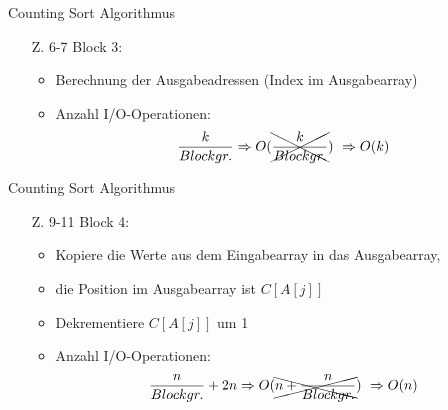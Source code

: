 \documentclass{beamer}
\begin{document}
\begin{frame}{Counting Sort Algorithmus}
  \begin{itemize}
    \item[Z. 6-7] Block 3:
    \begin{itemize}
      \item Berechnung der Ausgabeadressen (Index im Ausgabearray)
      \item Anzahl I/O-Operationen:
            \[
              \frac{k}{Blockgr.} \Rightarrow
              O(\xcancel{\frac{k}{Blockgr.}}) ~
              \Rightarrow O(k)
            \]
    \end{itemize}
  \end{itemize}
  \vspace{1cm}
  \begin{figure}
    \flushright
  \end{figure}
\end{frame}

\begin{frame}{Counting Sort Algorithmus}
  \begin{itemize}
    \item[Z. 9-11] Block 4:
    \begin{itemize}
      \item Kopiere die Werte aus dem Eingabearray in das Ausgabearray,
      \item die Position im Ausgabearray ist $C[A[j]]$
      \item Dekrementiere $C[A[j]]$ um 1
      \item Anzahl I/O-Operationen:
            \[
              \frac{n}{Blockgr.} + 2n \Rightarrow
              O(\xcancel{n + \frac{n}{Blockgr.}}) ~
              \Rightarrow O(n)
            \]
    \end{itemize}
  \end{itemize}

  \begin{figure}
    \flushright
  \end{figure}
\end{frame}
\end{document}
